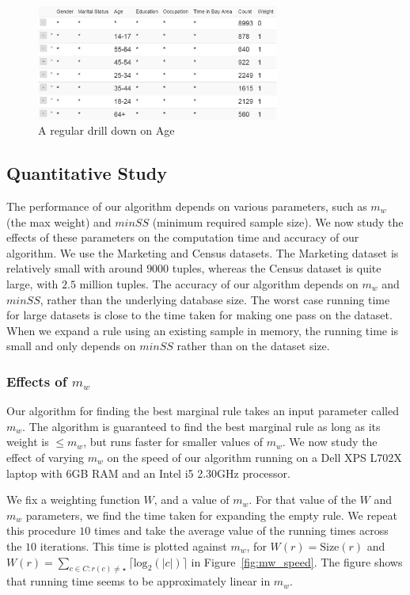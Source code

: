 \documentclass[10pt,journal,compsoc]{IEEEtran}
\begin{document}
\begin{figure}
\centering
\includegraphics[width=80mm,frame]{graphs/screenshots6col/age_drilldown.jpg}
\caption{A regular drill down on Age\label{fig:drilldownexample}}
\vspace{-10pt}
\end{figure}



\subsection{Quantitative Study}\label{sec:quantitative_study}
The performance of our algorithm depends on various parameters, such as $m_w$ (the max weight) and $minSS$ (minimum required sample size). We now study the effects of these parameters on the computation time and accuracy of our algorithm. We use the Marketing and Census datasets. The Marketing dataset is relatively small with around $9000$ tuples, whereas the Census dataset is quite large, with $2.5$ million tuples. The accuracy of our algorithm depends on $m_w$ and $minSS$, rather than the underlying database size. The worst case running time for large datasets is close to the time taken for making one pass on the dataset. When we expand a rule using an existing sample in memory, the running time is small and only depends on $minSS$ rather than on the dataset size.

\subsubsection{Effects of $m_w$}
Our algorithm for finding the best marginal rule takes an input parameter called $m_w$. The algorithm is guaranteed to find the best marginal rule as long as its weight is $\leq m_w$, but runs faster for smaller values of $m_w$. We now study the effect of varying $m_w$ on the speed of our algorithm running on a Dell XPS L702X laptop with 6GB RAM and an Intel i5 2.30GHz processor.

We fix a weighting function $W$, and a value of $m_w$. For that value of the $W$ and $m_w$ parameters, we find the time taken for expanding the empty rule. We repeat this procedure $10$ times and take the average value of the running times across the $10$ iterations. This time is plotted against $m_w$, for $W(r) = \text{Size}(r)$ and $W(r) = \sum_{c \in C : r(c) \neq \star} \lceil \text{log}_2(|c|) \rceil$ in Figure~\ref{fig:mw_speed}. The figure shows that running time seems to be approximately linear in $m_w$. 
\end{document}
